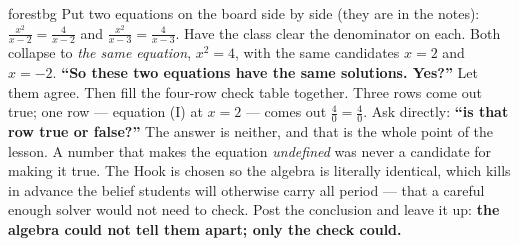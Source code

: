\documentclass[10pt]{article}
\begin{document}
\begin{skillbox}[Hook]{forestbg}
    Put two equations on the board side by side (they are in the notes):
    $\frac{x^2}{x-2}=\frac{4}{x-2}$ and $\frac{x^2}{x-3}=\frac{4}{x-3}$. Have the class clear the
    denominator on each. Both collapse to \emph{the same equation}, $x^2=4$, with the same candidates
    $x=2$ and $x=-2$. \textbf{``So these two equations have the same solutions. Yes?''} Let them agree.
    Then fill the four-row check table together. Three rows come out true; one row --- equation (I) at
    $x=2$ --- comes out $\frac40=\frac40$. Ask directly: \textbf{``is that row true or false?''} The
    answer is neither, and that is the whole point of the lesson. A number that makes the equation
    \emph{undefined} was never a candidate for making it true. The Hook is chosen so the algebra is
    literally identical, which kills in advance the belief students will otherwise carry all period ---
    that a careful enough solver would not need to check. Post the conclusion and leave it up:
    \textbf{the algebra could not tell them apart; only the check could.}
\end{skillbox}
\end{document}
